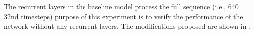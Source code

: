 
The recurrent layers in the baseline model process the full
sequence (i.e., 640 \gls{32nd} timesteps) purpose of this
experiment is to verify the performance of the network
without any recurrent layers. The modifications proposed are
shown in .

